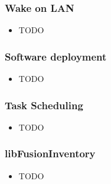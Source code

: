 \begin{frame}
    \frametitle{Wake on LAN}

    \begin{itemize}
        \item TODO
    \end{itemize}
\end{frame}


\begin{frame}
    \frametitle{Software deployment}

    \begin{itemize}
        \item TODO
    \end{itemize}
\end{frame}


\begin{frame}
    \frametitle{Task Scheduling}

    \begin{itemize}
        \item TODO
    \end{itemize}
\end{frame}


\begin{frame}
    \frametitle{libFusionInventory}
    
    \begin{itemize}
        \item TODO
    \end{itemize}
\end{frame}
